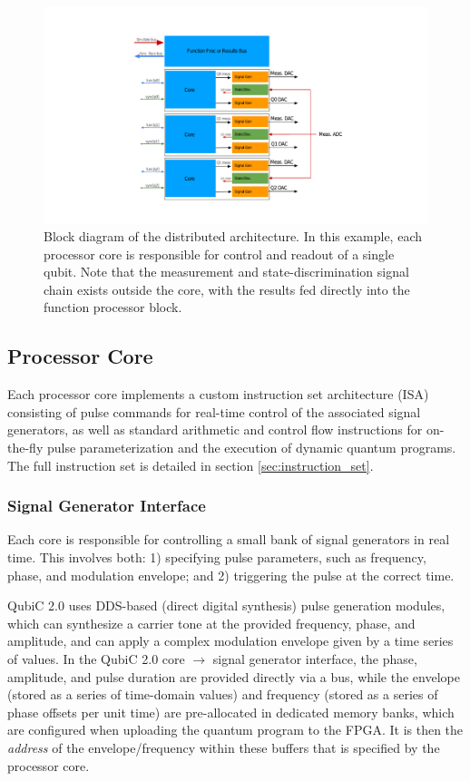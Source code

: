 \documentclass[journal]{IEEEtran}
\begin{document}
\begin{figure}
    \centering
    \includegraphics[scale=0.60, trim={150 40 0 40}, clip]
    {figures/full_arch_diagram.pdf}
    \caption{Block diagram of the distributed architecture. In this example, each processor core is responsible for control and readout of a single qubit. Note that the measurement and state-discrimination signal chain exists outside the core, with the results fed directly into the function processor block.}
    \label{fig:full_arch_bd}
\end{figure}

\subsection{Processor Core}

Each processor core implements a custom instruction set architecture (ISA) consisting of pulse commands for real-time control of the associated signal generators, as well as standard arithmetic and control flow instructions for on-the-fly pulse parameterization and the execution of dynamic quantum programs. The full instruction set is detailed in section \ref{sec:instruction_set}. 

\subsubsection{Signal Generator Interface}

Each core is responsible for controlling a small bank of signal generators in real time. This involves both: 1) specifying pulse parameters, such as frequency, phase, and modulation envelope; and 2) triggering the pulse at the correct time. 

QubiC 2.0 \cite{xu2023qubic} uses DDS-based (direct digital synthesis) pulse generation modules, which can synthesize a carrier tone at the provided frequency, phase, and amplitude, and can apply a complex modulation envelope given by a time series of values. In the QubiC 2.0 core $\rightarrow$ signal generator interface, the phase, amplitude, and pulse duration are provided directly via a bus, while the envelope (stored as a series of time-domain values) and frequency (stored as a series of phase offsets per unit time) are pre-allocated in dedicated memory banks, which are configured when uploading the quantum program to the FPGA. It is then the \textit{address} of the envelope/frequency within these buffers that is specified by the processor core.
\end{document}
